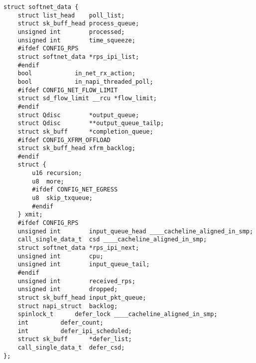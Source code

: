 \begin{center}
	\captionsetup{justification=raggedright,singlelinecheck=off}
	\begin{lstlisting}[label=lst:softnet_data,caption=Структуры softnet\_data]
struct softnet_data {
	struct list_head	poll_list;
	struct sk_buff_head	process_queue;
	unsigned int		processed;
	unsigned int		time_squeeze;
	#ifdef CONFIG_RPS
	struct softnet_data	*rps_ipi_list;
	#endif
	bool			in_net_rx_action;
	bool			in_napi_threaded_poll;
	#ifdef CONFIG_NET_FLOW_LIMIT
	struct sd_flow_limit __rcu *flow_limit;
	#endif
	struct Qdisc		*output_queue;
	struct Qdisc		**output_queue_tailp;
	struct sk_buff		*completion_queue;
	#ifdef CONFIG_XFRM_OFFLOAD
	struct sk_buff_head	xfrm_backlog;
	#endif
	struct {
		u16 recursion;
		u8  more;
		#ifdef CONFIG_NET_EGRESS
		u8  skip_txqueue;
		#endif
	} xmit;
	#ifdef CONFIG_RPS
	unsigned int		input_queue_head ____cacheline_aligned_in_smp;
	call_single_data_t	csd ____cacheline_aligned_in_smp;
	struct softnet_data	*rps_ipi_next;
	unsigned int		cpu;
	unsigned int		input_queue_tail;
	#endif
	unsigned int		received_rps;
	unsigned int		dropped;
	struct sk_buff_head	input_pkt_queue;
	struct napi_struct	backlog;
	spinlock_t		defer_lock ____cacheline_aligned_in_smp;
	int			defer_count;
	int			defer_ipi_scheduled;
	struct sk_buff		*defer_list;
	call_single_data_t	defer_csd;
};		
	\end{lstlisting}
\end{center}
\FloatBarrier

